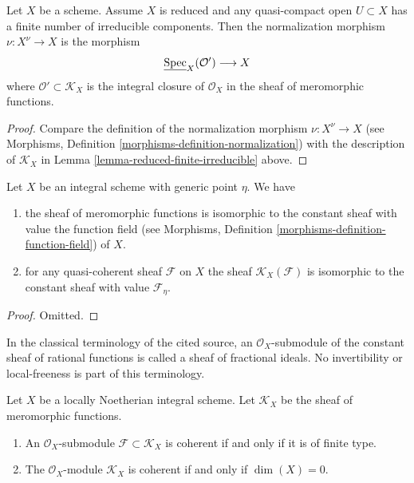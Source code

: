 \begin{lemma}
\label{lemma-reduced-normalization}
Let $X$ be a scheme.
Assume $X$ is reduced and any quasi-compact open $U \subset X$
has a finite number of irreducible components.
Then the normalization morphism $\nu : X^\nu \to X$ is the
morphism
$$
\underline{\mathop{\mathrm{Spec}}}_X(\mathcal{O}') \longrightarrow X
$$
where $\mathcal{O}' \subset \mathcal{K}_X$ is the integral
closure of $\mathcal{O}_X$ in the sheaf of meromorphic functions.
\end{lemma}

\begin{proof}
Compare the definition of the normalization morphism
$\nu : X^\nu \to X$ (see
Morphisms, Definition \ref{morphisms-definition-normalization})
with the description of $\mathcal{K}_X$ in
Lemma \ref{lemma-reduced-finite-irreducible} above.
\end{proof}

\begin{lemma}
\label{lemma-meromorphic-functions-integral-scheme}
Let $X$ be an integral scheme with generic point $\eta$. We have
\begin{enumerate}
\item the sheaf of meromorphic functions is
isomorphic to the constant sheaf with value the
function field (see
Morphisms, Definition \ref{morphisms-definition-function-field})
of $X$.
\item for any quasi-coherent sheaf $\mathcal{F}$ on $X$ the
sheaf $\mathcal{K}_X(\mathcal{F})$ is isomorphic to the
constant sheaf with value $\mathcal{F}_\eta$.
\end{enumerate}
\end{lemma}

\begin{proof}
Omitted.
\end{proof}

\begin{lemma}
\label{lemma-coherent-subsheaf-meromorphic-functions}
\begin{reference}
\cite[Chapter II, \S 2, no. 40, pp. 232--233]{FAC}
\end{reference}
\begin{history}
In the classical terminology of the cited source, an
$\mathcal{O}_X$-submodule of the constant sheaf of rational functions is
called a sheaf of fractional ideals. No invertibility or local-freeness is
part of this terminology.
\end{history}
Let $X$ be a locally Noetherian integral scheme. Let $\mathcal{K}_X$ be
the sheaf of meromorphic functions.
\begin{enumerate}
\item An $\mathcal{O}_X$-submodule $\mathcal{F} \subset \mathcal{K}_X$
is coherent if and only if it is of finite type.
\item The $\mathcal{O}_X$-module $\mathcal{K}_X$ is coherent if and only if
$\dim(X) = 0$.
\end{enumerate}
\end{lemma}

